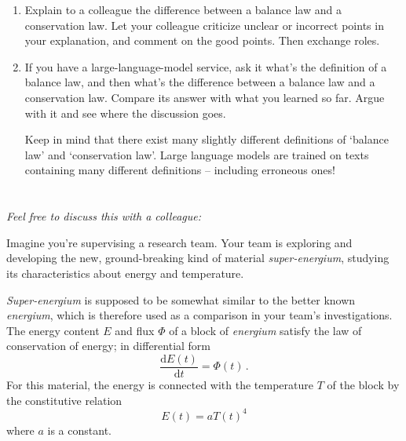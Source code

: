 \documentclass[a4paper,12pt,%
onecolumn,oneside,%
british%
]{memoir}
\newcommand*{\di}{\mathrm{d}}%
\renewcommand*{\|}[1][]{\nonscript\:#1\vert\nonscript\:\mathopen{}}
\newcommand*{\dt}{\di t}
\newcommand*{\yE}{E}
\newcommand*{\yH}{\varPhi}%
\newcommand*{\yT}{T}%
\begin{document}
\smallskip

\begin{enumerate}[exerc]
\item Explain to a colleague the difference between a balance law and a conservation law. Let your colleague criticize unclear or incorrect points in your explanation, and comment on the good points. Then exchange roles.
\item If you have a large-language-model service, ask it what's the definition of a balance law, and then what's the difference between a balance law and a conservation law. Compare its answer with what you learned so far. Argue with it and see where the discussion goes.\nopagebreak

  Keep in mind that there exist many slightly different definitions of \enquote*{balance law} and \enquote*{conservation law}.  Large language models are trained on texts containing many different definitions -- including erroneous ones!
\end{enumerate}








\section{}
\label{sec:change_bal_or_const}

\emph{Feel free to discuss this with a colleague:}

\smallskip

Imagine you're supervising a research team. Your team is exploring and developing the new, ground-breaking kind of material \emph{super-energium}, studying its characteristics about energy and temperature.

\emph{Super-energium} is supposed to be somewhat similar to the better known \emph{energium}, which is therefore used as a comparison in your team's investigations. The energy content $\yE$ and flux $\yH$ of a block of \emph{energium} satisfy the law of conservation of energy; in differential form
\begin{equation}\label{eq:energy_block}
  \frac{\di\yE(t)}{\dt} = \yH(t) \,.
\end{equation}
For this material, the energy is connected with the temperature $\yT$ of the block by the constitutive relation
\begin{equation}\label{eq:const_block}
  \yE(t) = a \yT(t)^{4}
\end{equation}
where $a$ is a constant.
\end{document}
